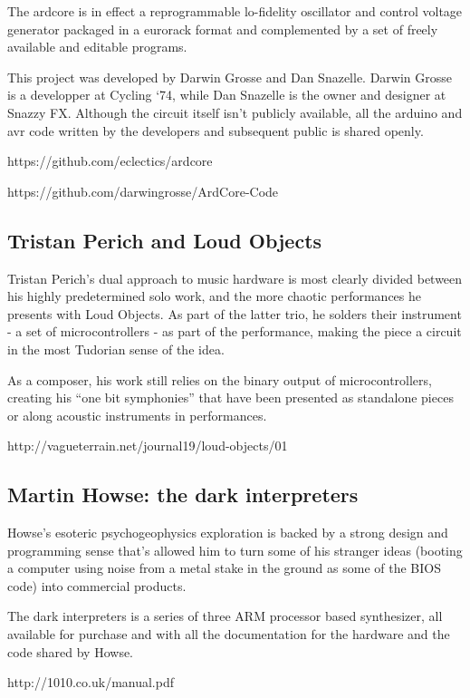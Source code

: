 The ardcore is in effect a reprogrammable lo-fidelity oscillator and control voltage generator packaged in a eurorack format and complemented by a set of freely available and editable programs. 

This project was developed by Darwin Grosse and Dan Snazelle. Darwin Grosse is a developper at Cycling `74, while Dan Snazelle is the owner and designer at Snazzy FX. Although the circuit itself isn't publicly available, all the arduino and avr code written by the developers and subsequent public is shared openly. 

https://github.com/eclectics/ardcore

https://github.com/darwingrosse/ArdCore-Code



\subsection{Tristan Perich and Loud Objects}

Tristan Perich's dual approach to music hardware is most clearly divided between his highly predetermined solo work, and the more chaotic performances he presents with Loud Objects. As part of the latter trio, he solders their instrument - a set of microcontrollers - as part of the performance, making the piece a circuit in the most Tudorian sense of the idea. 

As a composer, his work still relies on the binary output of microcontrollers, creating his ``one bit symphonies'' that have been presented as standalone pieces or along acoustic instruments in performances. 

http://vagueterrain.net/journal19/loud-objects/01

\subsection{Martin Howse: the dark interpreters}

Howse's esoteric psychogeophysics exploration is backed by a strong design and programming sense that's allowed him to turn some of his stranger ideas (booting a computer using noise from a metal stake in the ground as some of the BIOS code) into commercial products. 

The dark interpreters is a series of three ARM processor based synthesizer, all available for purchase and with all the documentation for the hardware and the code shared by Howse.  


http://1010.co.uk/manual.pdf

